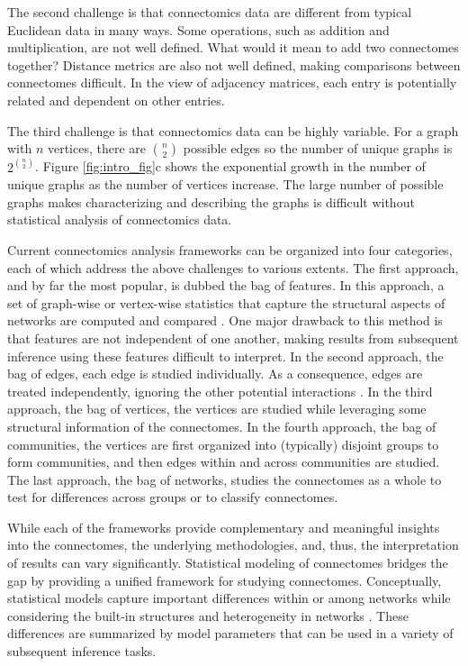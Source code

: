 The second challenge is that connectomics data are different from typical Euclidean data in many ways. Some operations, such as addition and multiplication, are not well defined. What would it mean to add two connectomes together? Distance metrics are also not well defined, making comparisons between connectomes difficult. In the view of adjacency matrices, each entry is potentially related and dependent on other entries.

The third challenge is that connectomics data can be highly variable. For a graph with $n$ vertices, there are $n \choose 2$ possible edges so the number of unique graphs is $2^{n \choose 2}$. Figure \ref{fig:intro_fig}c shows the exponential growth in the number of unique graphs as the number of vertices increase. The large number of possible graphs makes characterizing and describing the graphs is difficult without statistical analysis of connectomics data.

Current connectomics analysis frameworks can be organized into four categories, each of which address the above challenges to various extents.
The first approach, and by far the most popular, is dubbed the bag of features. In this approach, a set of graph-wise or vertex-wise statistics that capture the structural aspects of networks are computed and compared \cite{Bullmore2010-ew,mhembere2013computing}. One major drawback to this method is that features are not independent of one another, making results from subsequent inference using these features difficult to interpret.
In the second approach, the bag of edges, each edge is studied individually. As a consequence, edges are treated independently, ignoring the other potential interactions \cite{Craddock2013-qs,Varoquaux2010-tc}. 
In the third approach, the bag of vertices, the vertices are studied while leveraging some structural information of the connectomes.
In the fourth approach, the bag of communities, the vertices are first organized into (typically) disjoint groups to form communities, and then edges within and across communities are studied. The last approach, the bag of networks, studies the connectomes as a whole to test for differences across groups or to classify connectomes.

While each of the frameworks provide complementary and meaningful insights into the connectomes, the underlying methodologies, and, thus, the interpretation of results can vary significantly. Statistical modeling of connectomes bridges the gap by providing a unified framework for studying connectomes. Conceptually, statistical models capture important differences within or among networks while considering the built-in structures and heterogeneity in networks \cite{Zheng2009-df,athreya2017statistical,arroyo2019inference, zhang2018network}. These differences are summarized by model parameters that can be used in a variety of subsequent inference tasks. 


